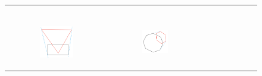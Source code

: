 \documentclass [12pt]{article}
\begin{document}
\begin{enumerate}[label=(\alph*)]
\begin{figure}[h]
\begin{tabular}{ccc}
\begin{subfigure}{0.33\textwidth}
                    \caption{}
                    \label{fig:supportline3c}
                \end{subfigure}\\
                \begin{subfigure}{0.33\textwidth}
                    \centering
                    \includegraphics[width=0.7\textwidth]{images/supportline3d.PNG}
                    \caption{}
                    \label{fig:supportline3d}
                \end{subfigure} & 
                \begin{subfigure}{0.33\textwidth}
                    \centering
                    \includegraphics[width=0.7\textwidth]{images/supportline3e.PNG}
                    \caption{}
                    \label{fig:supportline3e}
                \end{subfigure} &
                \begin{subfigure}{0.33\textwidth}

\end{subfigure}
\end{tabular}
\end{figure}
\end{enumerate}
\end{document}

